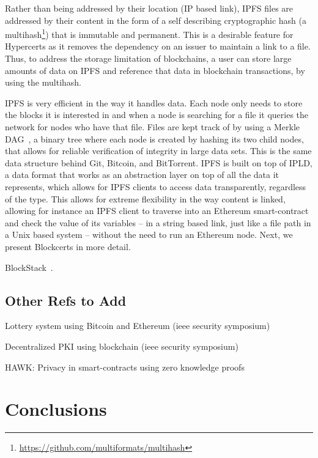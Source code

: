\documentclass[letterpaper,twocolumn,10pt]{article}
\begin{document}
Rather than being addressed by their location (IP based link), IPFS files are addressed by their content in the form of a self describing cryptographic hash (a multihash\footnote{\url{https://github.com/multiformats/multihash}}) that is immutable and permanent. This is a desirable feature for Hypercerts as it removes the dependency on an issuer to maintain a link to a file. Thus, to address the storage limitation of blockchains, a user can store large amounts of data on IPFS and reference that data in blockchain transactions, by using the multihash.

IPFS is very efficient in the way it handles data. Each node only needs to store the blocks it is interested in and when a node is searching for a file it queries the network for nodes who have that file. Files are kept track of by using a Merkle DAG~\cite{Merkle:1987jk}, a binary tree where each node is created by hashing its two child nodes, that allows for reliable verification of integrity in large data sets. This is the same data structure behind Git, Bitcoin, and BitTorrent. IPFS is built on top of IPLD, a data format that works as an abstraction layer on top of all the data it represents, which allows for IPFS clients to access data transparently, regardless of the type. This allows for extreme flexibility in the way content is linked, allowing for instance an IPFS client to traverse into an Ethereum smart-contract and check the value of its variables -- in a string based link, just like a file path in a Unix based system -- without the need to run an Ethereum node. Next, we present Blockcerts in more detail.

BlockStack~\cite{blockstack}.

\subsection{Other Refs to Add}
Lottery system using Bitcoin and Ethereum (ieee security symposium) \cite{Miller:2017cf}

Decentralized PKI using blockchain (ieee security symposium) \cite{Anonymous:umr1kkOC}

HAWK: Privacy in smart-contracts using zero knowledge proofs \cite{Kosba:2016iq}





\section{Conclusions}
\end{document}
